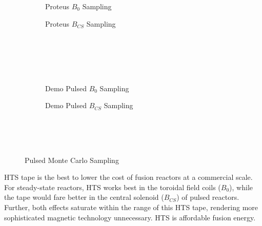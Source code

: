 \begin{figure*}
    \centering
    \hfill 
    \begin{subfigure}[t]{0.45\textwidth}
        \centering
		\begin{adjustbox}{width=\textwidth}
			\Large
			
		\end{adjustbox}
        \caption{Proteus $B_0$ Sampling}
    \end{subfigure}
    \hfill
    \begin{subfigure}[t]{0.45\textwidth}
        \centering
		\begin{adjustbox}{width=\textwidth}
			\Large
			
		\end{adjustbox}
        \caption{Proteus $B_{CS}$ Sampling}
    \end{subfigure}
    \hfill \hfill ~\\ ~\\ ~\\ ~\\
    \hfill 
    \begin{subfigure}[t]{0.45\textwidth}
        \centering
		\begin{adjustbox}{width=\textwidth}
			\Large
			
		\end{adjustbox}
        \caption{Demo Pulsed $B_0$ Sampling}
    \end{subfigure}
    \hfill
    \begin{subfigure}[t]{0.45\textwidth}
        \centering
		\begin{adjustbox}{width=\textwidth}
			\Large
			
		\end{adjustbox}
        \caption{Demo Pulsed $B_{CS}$ Sampling}
    \end{subfigure}	
    \hfill \hfill ~\\ ~\\ ~\\
    \caption{Pulsed Monte Carlo Sampling}
    \label{fig:pulsed_samplings}
\end{figure*}

 HTS tape is  the best  to lower the cost of fusion reactors at a commercial scale. For steady-state reactors, HTS works best in the toroidal field coils ($B_0$), while the tape would fare better in the central solenoid ($B_{CS}$) of pulsed reactors. Further, both effects saturate within the range of this HTS tape, rendering more sophisticated magnetic technology unnecessary. HTS is  affordable fusion energy.

